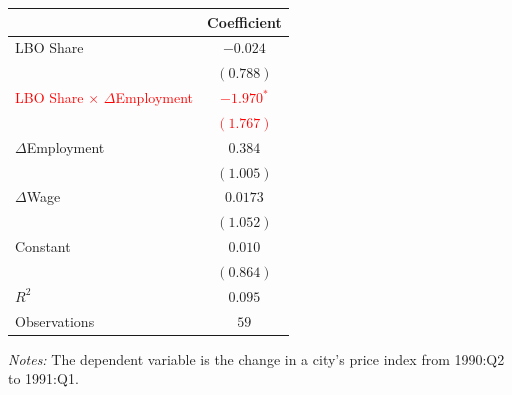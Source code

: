 \begin{minipage}{\textwidth}
    \centering
    \footnotesize
    \renewcommand{\arraystretch}{1.0}
    \begin{tabular}{@{}lc@{}}
        \toprule
        & \textbf{Coefficient} \\
        \midrule
        LBO Share
            & $-0.024$ \\
            & $(0.788)$ \\
        \textcolor{red}{LBO Share $\times$ $\Delta$Employment}
            & \textcolor{red}{$-1.970^{*}$} \\
            & \textcolor{red}{$(1.767)$} \\
        $\Delta$Employment
            & $0.384$ \\
            & $(1.005)$ \\
        $\Delta$Wage
            & $0.0173$ \\
            & $(1.052)$ \\
        Constant
            & $0.010$ \\
            & $(0.864)$ \\
        \midrule
        $R^2$ & $0.095$ \\
        Observations & $59$ \\
        \bottomrule
    \end{tabular}

    \vspace{0.1cm}
    \centering
    \scriptsize
    \textit{Notes:} The dependent variable is the change in a city's price index
    from 1990:Q2 to 1991:Q1.
\end{minipage}
